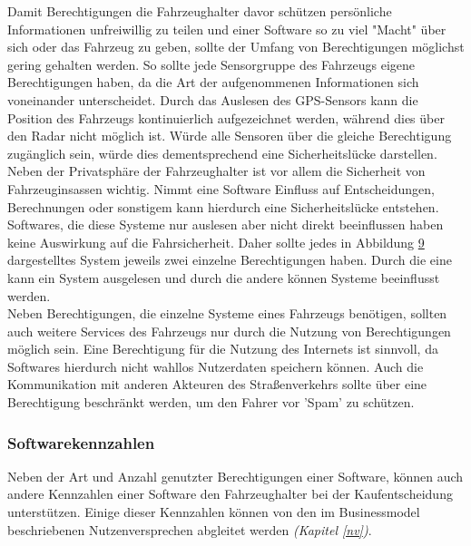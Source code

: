 Damit Berechtigungen die Fahrzeughalter davor schützen persönliche Informationen unfreiwillig zu teilen und einer Software so zu viel "Macht" über sich oder das Fahrzeug zu geben, sollte der Umfang von Berechtigungen möglichst gering gehalten werden. So sollte jede Sensorgruppe des Fahrzeugs eigene Berechtigungen haben, da die Art der aufgenommenen Informationen sich voneinander unterscheidet. Durch das Auslesen des GPS-Sensors kann die Position des Fahrzeugs kontinuierlich aufgezeichnet werden, während dies über den Radar nicht möglich ist. Würde alle Sensoren über die gleiche Berechtigung zugänglich sein, würde dies dementsprechend eine Sicherheitslücke darstellen.\\

Neben der Privatsphäre der Fahrzeughalter ist vor allem die Sicherheit von Fahrzeuginsassen wichtig. Nimmt eine Software Einfluss auf Entscheidungen, Berechnungen oder sonstigem kann hierdurch eine Sicherheitslücke entstehen. Softwares, die diese Systeme nur auslesen aber nicht direkt beeinflussen haben keine Auswirkung auf die Fahrsicherheit. 
Daher sollte jedes in Abbildung \hyperref[img:av_architecture]{9} dargestelltes System jeweils zwei einzelne Berechtigungen haben. Durch die eine kann ein System ausgelesen und durch die andere können Systeme beeinflusst werden.\\

Neben Berechtigungen, die einzelne Systeme eines Fahrzeugs benötigen, sollten auch weitere Services des Fahrzeugs nur durch die Nutzung von Berechtigungen möglich sein. Eine Berechtigung für die Nutzung des Internets ist sinnvoll, da Softwares hierdurch nicht wahllos Nutzerdaten speichern können. Auch die Kommunikation mit anderen Akteuren des Straßenverkehrs sollte über eine Berechtigung beschränkt werden, um den Fahrer vor 'Spam' zu schützen.

\subsubsection{Softwarekennzahlen}
Neben der Art und Anzahl genutzter Berechtigungen einer Software, können auch andere Kennzahlen einer Software den Fahrzeughalter bei der Kaufentscheidung unterstützen. Einige dieser Kennzahlen können von den im Businessmodel beschriebenen Nutzenversprechen abgleitet werden \textit{(Kapitel \ref{nv})}.\\

